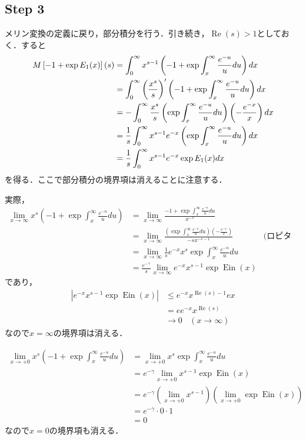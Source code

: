 \documentclass{jsarticle}
\newcommand{\Ein}{\operatorname{Ein}}
\renewcommand\Re{\operatorname{Re}}
\theoremstyle{definition}
\begin{document}
\subsection*{Step 3}
メリン変換の定義に戻り，部分積分を行う．引き続き，$\Re(s)>1$としておく．すると
\begin{align}
M\left[ -1 + \exp E_1(x) \right](s) &= \int_0^\infty x^{s-1} \left(-1 + \exp \int_{x}^\infty \frac{e^{-u}}{u} du\right) dx \notag \\
&= \int_0^\infty \left(\frac{x^s}{s}\right)' \left(-1 + \exp \int_{x}^\infty \frac{e^{-u}}{u} du\right) dx \notag \\
&= - \int_0^\infty \frac{x^s}{s} \left( \exp \int_{x}^\infty \frac{e^{-u}}{u} du\right) \left(-\frac{e^{-x}}{x}\right) dx \notag \\
&= \frac{1}{s} \int_0^\infty x^{s-1} e^{-x} \left( \exp \int_{x}^\infty \frac{e^{-u}}{u} du\right) dx \notag \\
&= \frac{1}{s} \int_0^\infty x^{s-1} e^{-x} \exp E_1(x) dx \label{step3_conclusion}
\end{align}
を得る．ここで部分積分の境界項は消えることに注意する．

実際，
\begin{align*}
\lim_{x\to\infty} x^s (-1+\exp \int_x^\infty \frac{e^{-u}}{u}du)
&= \lim_{x\to\infty} \frac{-1+\exp \int_x^\infty \frac{e^{-u}}{u}du}{x^{-s}} \\
&= \lim_{x\to\infty} \frac{(\exp \int_x^\infty \frac{e^{-u}}{u}du) (-\frac{e^{-x}}{x})}{-s x^{-s-1}}  & \text{(ロピタル)} \\
&= \lim_{x\to\infty} \frac{1}{s} e^{-x} x^{s} \exp \int_x^\infty \frac{e^{-u}}{u}du \\
&= \frac{e^{-\gamma}}{s} \lim_{x\to\infty} e^{-x} x^{s-1} \exp \Ein(x)
\end{align*}
であり，
\begin{align*}
|e^{-x} x^{s-1} \exp \Ein(x)| &\le e^{-x} x^{\Re(s)-1} e x \\
&= e e^{-x} x^{\Re(s)} \\
&\to 0 \ \ \ \ (x \to \infty)
\end{align*}
なので$x=\infty$の境界項は消える．

\begin{align*}
\lim_{x\to +0} x^s (-1+\exp \int_x^\infty \frac{e^{-u}}{u}du)
&= \lim_{x\to +0} x^s \exp \int_x^\infty \frac{e^{-u}}{u}du \\
&= e^{-\gamma} \lim_{x\to +0} x^{s-1} \exp \Ein(x) \\
&= e^{-\gamma} (\lim_{x\to +0} x^{s-1}) (\lim_{x\to +0} \exp \Ein(x)) \\
&= e^{-\gamma} \cdot 0 \cdot 1 \\
&= 0
\end{align*}
なので$x=0$の境界項も消える．
\end{document}
